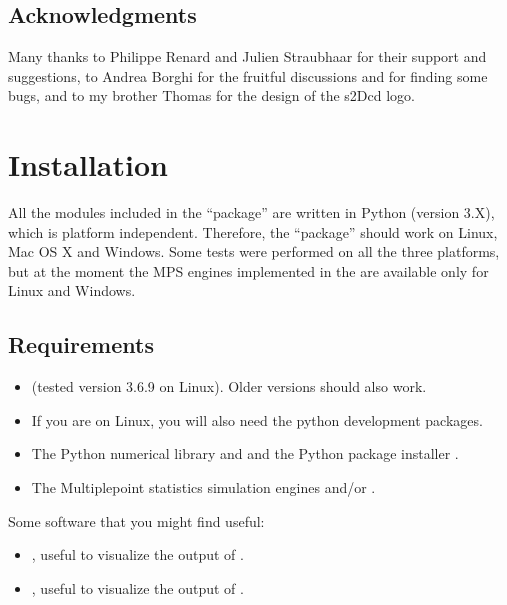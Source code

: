 \documentclass[letterpaper,10pt,english]{sphinxmanual}
\begin{document}
\section{Acknowledgments}
\label{\detokenize{purpose:acknowledgments}}
Many thanks to Philippe Renard and Julien Straubhaar for their support
and suggestions, to Andrea Borghi for the fruitful discussions and for
finding some bugs, and to my brother Thomas for the design of the
s2Dcd logo.


\chapter{Installation}
\label{\detokenize{installation:installation}}\label{\detokenize{installation::doc}}
All the modules included in the “package” are written in Python
(version 3.X), which is platform independent. Therefore, the “package”
should work on Linux, Mac OS X and Windows. Some tests were performed
on all the three platforms, but at the moment the MPS engines
implemented in the  are available only for Linux and Windows.


\section{Requirements}
\label{\detokenize{installation:requirements}}\begin{itemize}
\item {} 
 (tested version 3.6.9 on Linux). Older versions should also work.

\item {} 
If you are on Linux, you will also need the python development packages.

\item {} 
The Python numerical library  and
 and the Python package installer .

\item {} 
The Multiple\sphinxhyphen{}point statistics simulation engines  and/or .

\end{itemize}

\begin{sphinxShadowBox}

Some software that you might find useful:
\begin{itemize}
\item {} 
, useful to visualize the
 output of .

\item {} 
, useful to visualize the
 output of .

\end{itemize}
\end{sphinxShadowBox}
\end{document}
